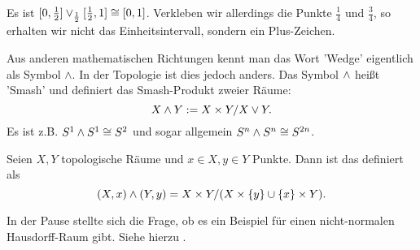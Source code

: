 \begin{example}
    Es ist $[0,\frac{1}{2}] \vee_{\frac{1}{2}} [\frac{1}{2},1] \cong [0,1]$. Verkleben wir allerdings die Punkte $\frac{1}{4}$ und $\frac{3}{4}$, so erhalten wir nicht das Einheitsintervall, sondern ein Plus-Zeichen.
\end{example}

\begin{remark*}
    Aus anderen mathematischen Richtungen kennt man das Wort 'Wedge' eigentlich als Symbol $\wedge$. In der Topologie ist dies jedoch anders. Das Symbol $\wedge$ heißt 'Smash' und definiert das Smash-Produkt zweier Räume:
     \[
    X \land Y := X \times  Y / X \vee Y
    .\]  
Es ist z.B. $S^1\wedge S^1 \cong S^2$ und sogar allgemein $S^n \wedge S^n \cong S^{2n}$.
\end{remark*}

\begin{definition}\label{def:smash-produkt}
    Seien $X,Y$ topologische Räume und  $x\in X, y\in Y$ Punkte. Dann ist das  definiert als
    \[
        (X,x) \wedge (Y,y) = X\times Y / (X\times \left \{y\right\} \cup \left \{x\right\} \times Y)
    .\] 
\end{definition}


\begin{remark*}
    In der Pause stellte sich die Frage, ob es ein Beispiel für einen nicht-normalen Hausdorff-Raum gibt. Siehe hierzu \cite[][Gegenbeispiel 86]{counterexamples}.
\end{remark*}

